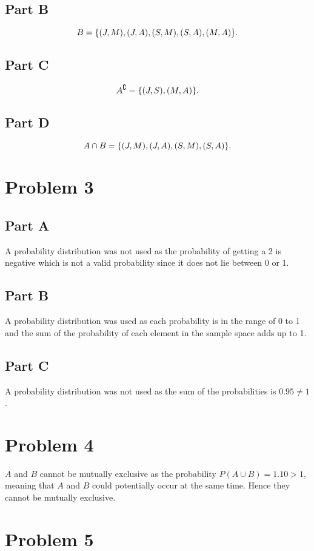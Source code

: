 \documentclass[12pt]{extarticle}
\begin{document}
\subsection*{Part B}
\[
	B = \qty{
		(J,M),
		(J,A),
		(S,M),
		(S,A),
		(M,A)
	}
.\]

\subsection*{Part C}
\[
	A^\complement = \qty{
		(J,S),
		(M,A)
	}
.\]

\subsection*{Part D}
\[
	A\cap B = \qty{
		(J, M),
		(J, A),
		(S, M),
		(S, A)
	}
.\]

\section*{Problem 3}
\subsection*{Part A}
A probability distribution was not used as the probability of getting a 2 is negative which is not a valid probability since it does not lie between 0 or 1.

\subsection*{Part B}
A probability distribution was used as each probability is in the range of 0 to 1 and the sum of the probability of each element in the sample space adds up to 1.

\subsection*{Part C}
A probability distribution was not used as the sum of the probabilities is $0.95 \neq 1$.

\section*{Problem 4}
$A$ and $B$ cannot be mutually exclusive as the probability $P(A \cup B) = 1.10 > 1$, meaning that $A$ and $B$ could potentially occur at the same time. Hence they cannot be mutually exclusive.

\section*{Problem 5}
\end{document}
